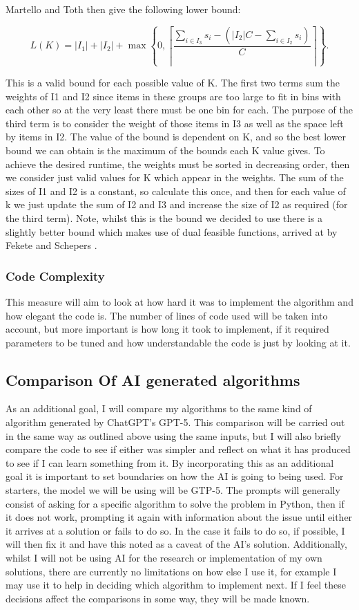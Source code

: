 \documentclass[12pt]{article}
\begin{document}
Martello and Toth then give the following lower bound: 

\[
L(K)=|I_1|+|I_2|+\max\!\left\{0,\left\lceil
\frac{\sum_{i\in I_3}s_i-\left(|I_2|C-\sum_{i\in I_2}s_i\right)}{C}
\right\rceil\right\}.
\]


This is a valid bound for each possible value of K. The first two terms sum the weights of I1 and I2 since items in these groups are too large to fit in bins with each other so at the very least there must be one bin for each. The purpose of the third term is to consider the weight of those items in I3 as well as the space left by items in I2. The value of the bound is dependent on K, and so the best lower bound we can obtain is the maximum of the bounds each K value gives. To achieve the desired runtime, the weights must be sorted in decreasing order, then we consider just valid values for K which appear in the weights. The sum of the sizes of I1 and I2 is a constant, so calculate this once, and then for each value of k we just update the sum of I2 and I3 and increase the size of I2 as required (for the third term). Note, whilst this is the bound we decided to use there is a slightly better bound which makes use of dual feasible functions, arrived at by Fekete and Schepers \cite{fekete}. 

\subsubsection{Code Complexity}
This measure will aim to look at how hard it was to implement the algorithm and how elegant the code is. The number of lines of code used will be taken into account, but more important is how long it took to implement, if it required parameters to be tuned and how understandable the code is just by looking at it. 

\subsection{Comparison Of AI generated algorithms}
As an additional goal, I will compare my algorithms to the same kind of algorithm generated by ChatGPT's GPT-5. This comparison will be carried out in the same way as outlined above using the same inputs, but I will also briefly compare the code to see if either was simpler and reflect on what it has produced to see if I can learn something from it. By incorporating this as an additional goal it is important to set boundaries on how the AI is going to being used. For starters, the model we will be using will be GTP-5. The prompts will generally consist of asking for a specific algorithm to solve the problem in Python, then if it does not work, prompting it again with information about the issue until either it arrives at a solution or fails to do so. In the case it fails to do so, if possible, I will then fix it and have this noted as a caveat of the AI's solution. Additionally, whilst I will not be using AI for the research or implementation of my own solutions, there are currently no limitations on how else I use it, for example I may use it to help in deciding which algorithm to implement next. If I feel these decisions affect the comparisons in some way, they will be made known. 
\end{document}

